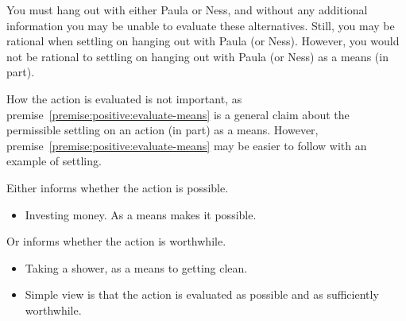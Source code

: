 \documentclass[10pt]{article}
\newcommand{\hozlinedash}[0]{%
  \noindent\hdashrule[0.5ex][c]{\textwidth}{.1pt}{2.5pt}
}
\begin{document}
\begin{example}
  You must hang out with either Paula or Ness, and without any additional information you may be unable to evaluate these alternatives.
  Still, you may be rational when settling on hanging out with Paula (or Ness).
  However, you would not be rational to settling on hanging out with Paula (or Ness) as a means (in part).
\end{example}

\hozlinedash

How the action is evaluated is not important, as premise~\ref{premise:positive:evaluate-means} is a general claim about the permissible settling on an action (in part) as a means.
However, premise~\ref{premise:positive:evaluate-means} may be easier to follow with an example of settling.

Either informs whether the action is possible.
\begin{itemize}
\item Investing money.
  As a means makes it possible.
\end{itemize}
Or informs whether the action is worthwhile.
\begin{itemize}
\item Taking a shower, as a means to getting clean.
\end{itemize}


\begin{itemize}
\item Simple view is that the action is evaluated as possible and as sufficiently worthwhile.
\end{itemize}
\end{document}
